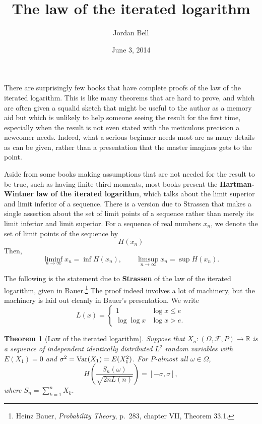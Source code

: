 \documentclass{article}
\newcommand{\Var}{\ensuremath\mathrm{Var}}
\newtheorem{theorem}{Theorem}
\theoremstyle{definition}
\begin{document}
\title{The law of the iterated logarithm}
\author{Jordan Bell}
\date{June 3, 2014}

\maketitle

There are surprisingly few books that have complete proofs of the law of the iterated logarithm. This is like
many theorems that are hard to prove, and which are often given a squalid sketch that might be useful
to the author as a memory aid but
which is unlikely to help someone seeing the result for the first time, especially when the result is not even stated with the meticulous
precision a newcomer needs.
Indeed, what a serious beginner needs most are as many details as can be given, rather than a presentation that the master imagines
gets to the point. 

 Aside from some books
 making assumptions that are not needed for the result to be true, such as having finite third moments, most books
 present the \textbf{Hartman-Wintner law of the iterated logarithm}, which 
talks about  the limit superior and limit inferior of a sequence. There is a version due to
 Strassen that makes  a single assertion  about the set of limit points of a sequence rather than merely its limit inferior and limit superior.
 For a sequence of real numbers $x_n$, we denote the set of limit points of the sequence by
 \[
 H(x_n)
 \]
Then,
  \[
  \liminf_{n \to \infty} x_n = \inf H(x_n), \qquad \limsup_{n \to \infty} x_n = \sup H(x_n).
  \]
 
 The following is the statement due to \textbf{Strassen} of the law of the iterated logarithm, given
in Bauer.\footnote{Heinz
Bauer, {\em Probability Theory}, p.~283, chapter VII, Theorem 33.1.} The proof indeed involves a lot of machinery, but the machinery is laid out cleanly in Bauer's presentation.
We write 
\[
L(x) = \begin{cases}
1&\log x \leq e\\
\log \log x&\log x>e.
\end{cases}
\]

\begin{theorem}[Law of the iterated logarithm]
Suppose that $X_n:(\Omega,\mathscr{F},P) \to \mathbb{R}$ is a sequence of independent identically distributed $L^2$ random variables
with $E(X_1)=0$ and $\sigma^2=\Var(X_1)=E(X_1^2)$. For 
$P$-almost all $\omega \in \Omega$,
\[
H\left(\frac{S_n(\omega)}{\sqrt{2nL(n)}}\right) = [-\sigma,\sigma],
\]
where $S_n=\sum_{k=1}^n X_k$. 
\end{theorem}
\end{document}
